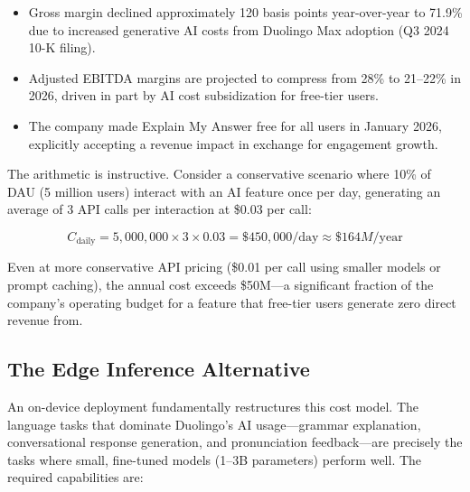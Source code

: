\documentclass[12pt, letterpaper, twoside]{report}
\begin{document}
\begin{itemize}[itemsep=1pt, topsep=2pt, parsep=0pt]
\item Gross margin declined approximately 120 basis points year-over-year to 71.9\% due to increased generative AI costs from Duolingo Max adoption (Q3 2024 10-K filing).
\item Adjusted EBITDA margins are projected to compress from 28\% to 21--22\% in 2026, driven in part by AI cost subsidization for free-tier users.
\item The company made Explain My Answer free for all users in January 2026, explicitly accepting a revenue impact in exchange for engagement growth.
\end{itemize}

The arithmetic is instructive. Consider a conservative scenario where 10\% of DAU (5 million users) interact with an AI feature once per day, generating an average of 3 API calls per interaction at \$0.03 per call:

\begin{equation}
C_{\text{daily}} = 5{,}000{,}000 \times 3 \times 0.03 = \$450{,}000/\text{day} \approx \$164M/\text{year}
\label{eq:duolingo_cost}
\end{equation}

Even at more conservative API pricing (\$0.01 per call using smaller models or prompt caching), the annual cost exceeds \$50M---a significant fraction of the company's operating budget for a feature that free-tier users generate zero direct revenue from.

\subsection{The Edge Inference Alternative}

An on-device deployment fundamentally restructures this cost model. The language tasks that dominate Duolingo's AI usage---grammar explanation, conversational response generation, and pronunciation feedback---are precisely the tasks where small, fine-tuned models (1--3B parameters) perform well. The required capabilities are:
\end{document}

